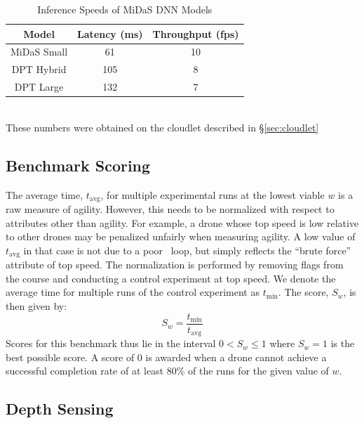 \begin{table}
\small
	\centering
        \begin{tabular}{|c|c|c|}
		\hline
		\textbf{Model} & \textbf{Latency (ms)} & \textbf{Throughput (fps)} \\
		\hline
		MiDaS Small & 61 & 10 \\
		DPT Hybrid & 105 & 8 \\
		DPT Large & 132 & 7 \\
		\hline
	\end{tabular}
\begin{captext}
\centering
    \\[0.1cm]
  \small These numbers were obtained on the cloudlet described in
  \S\ref{sec:cloudlet}
\end{captext}
\caption{Inference Speeds of MiDaS DNN Models}
\label{tab:midas-model-stats}
\end{table}

\subsection{Benchmark Scoring}
\label{sec:avoidance-scoring}

The average time, $t_{\text{avg}}$, for multiple experimental runs at
the lowest viable $w$ is a raw measure of agility.  However, this needs
to be normalized with respect to attributes other than agility.
For example, a drone whose top speed is low relative to other drones
may be penalized unfairly when measuring agility.  A low value of
$t_{\text{avg}}$ in that case is not due to a poor \ooda~loop, but
simply reflects the ``brute force'' attribute of top speed.  The
normalization is performed by removing flags from the course and
conducting a control experiment at top speed.  We denote the average
time for multiple runs of the control experiment as $t_{\text{min}}$.
The score, $S_w$, is then given by:
\begin{equation}
	S_w = \frac{t_{\text{min}}}{t_{\text{avg}}}\label{eq:1}
\end{equation}
Scores for this benchmark thus lie in the interval $0 < S_w \leq 1$
where $S_w = 1$ is the best possible score. A score of 0 is awarded
when a drone cannot achieve a successful completion rate of at least
80\% of the runs for the given value of $w$.

\subsection{Depth Sensing}
\label{sec:midas}

